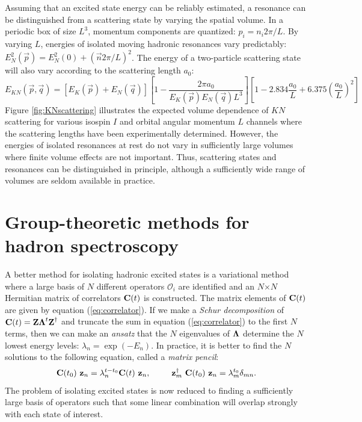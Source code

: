 \documentclass[letterpaper]{jpconf}
\newcommand{\bvec}[1]{\ensuremath{\mbox{\boldmath $\mathbf{#1}$}}}
\begin{document}
Assuming that an excited state energy can be reliably estimated, a resonance
can be distinguished from a scattering state by varying the spatial volume.
In a periodic box of size $L^3$, momentum components are quantized: $p_i = n_i
2 \pi / L$.  By varying $L$, energies of isolated moving hadronic resonances
vary predictably: $E_N^2(\vec{p}) = E_N^2(0) + (\vec{n} 2 \pi / L)^2$.
The energy of a two-particle scattering state will also vary according
to the scattering length $a_0$:
%
\begin{equation}
E_{KN}(\vec{p}, \vec{q}) = \left[ E_K(\vec{p}) + E_N( \vec{q}) \right]
\left[ 1 - \frac{2 \pi a_0}{E_K(\vec{p}) E_N(\vec{q}) L^3} \right] \left[
  1 - 2.834 \frac{a_0}{L} + 6.375 \left( \frac{a_0}{L} \right)^2
\right]
\end{equation}
%
Figure \ref{fig:KNscattering} illustrates the expected volume dependence of
$KN$ scattering for various isospin $I$ and orbital angular momentum $L$
channels where the scattering lengths have been experimentally determined.
However, the energies of isolated resonances at rest do not vary in
sufficiently large volumes where finite volume effects are not important.
Thus, scattering states and resonances can be distinguished in principle,
although a sufficiently wide range of volumes are seldom available in
practice.

\section{\label{sec:group_theory}Group-theoretic methods for hadron
         spectroscopy}

A better method for isolating hadronic excited states is a variational method
where a large basis of $N$ different operators $\mathcal{O}_i$ are identified
and an $N$$\times$$N$ Hermitian matrix of correlators $\bvec{C}(t)$ is
constructed.  The matrix elements of $\bvec{C}(t)$ are given by equation
(\ref{eq:correlator}).  If we make a \textsl{Schur decomposition} of
$\bvec{C}(t) = \bvec{Z} \bvec{\Lambda}^t \bvec{Z}^\dagger$ and truncate the
sum in equation (\ref{eq:correlator}) to the first $N$ terms, then we can make
an \textit{ansatz} that the $N$ eigenvalues of $\bvec{\Lambda}$ determine
the $N$ lowest energy levels: $\lambda_n = \exp(-E_n)$.  In practice,
it is better to find the $N$ solutions to the following equation,
called a \textsl{matrix pencil}:
%
\begin{equation}
\label{eq:pencil}
\bvec{C}(t_0)\ \bvec{z}_n = \lambda_n^{t-t_0} \bvec{C}(t)\ \bvec{z}_n,
\qquad \bvec{z}_m^\dagger\ \bvec{C}(t_0)\ \bvec{z}_n
= \lambda_m^{t_0} \delta_{mn}.
\end{equation}
%
The problem of isolating excited states is now reduced to finding a
sufficiently large basis of operators such that some linear combination will
overlap strongly with each state of interest.
\end{document}
